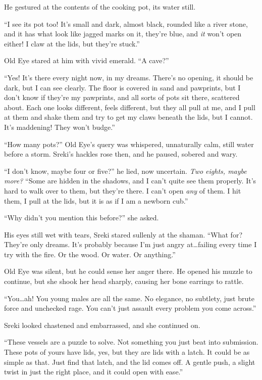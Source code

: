 He gestured at the contents of the cooking pot, its water still.

``I see its pot too! It's small and dark, almost black, rounded like a river stone, and it has what look like jagged marks on it, they're blue, and \emph{it} won't open either! I claw at the lids, but they're stuck.''

Old Eye stared at him with vivid emerald. ``A cave?''

``Yes! It's there every night now, in my dreams. There's no opening, it should be dark, but I can see clearly. The floor is covered in sand and pawprints, but I don't know if they're my pawprints, and all sorts of pots sit there, scattered about. Each one looks different, feels different, but they all pull at me, and I pull at them and shake them and try to get my claws beneath the lids, but I cannot. It's maddening! They won't budge.''

``How many pots?'' Old Eye's query was whispered, unnaturally calm, still water before a storm. Sreki's hackles rose then, and he paused, sobered and wary.

``I don't know, maybe four or five?'' he lied, now uncertain. \emph{Two eights, maybe more?} ``Some are hidden in the shadows, and I can't quite see them properly. It's hard to walk over to them, but they're there. I can't open \emph{any} of them. I hit them, I pull at the lids, but it is as if I am a newborn cub.''

``Why didn't you mention this before?'' she asked.

His eyes still wet with tears, Sreki stared sullenly at the shaman. ``What for? They're only dreams. It's probably because I'm just angry at\ldots{}failing every time I try with the fire. Or the wood. Or water. Or anything.''

Old Eye was silent, but he could sense her anger there. He opened his muzzle to continue, but she shook her head sharply, causing her bone earrings to rattle.

``You\ldots{}ah! You young males are all the same. No elegance, no subtlety, just brute force and unchecked rage. You can't just assault every problem you come across.''

Sreki looked chastened and embarrassed, and she continued on.

``These vessels are a puzzle to solve. Not something you just beat into submission. These pots of yours have lids, yes, but they are lids with a latch. It could be as simple as that. Just find that latch, and the lid comes off. A gentle push, a slight twist in just the right place, and it could open with ease.''

